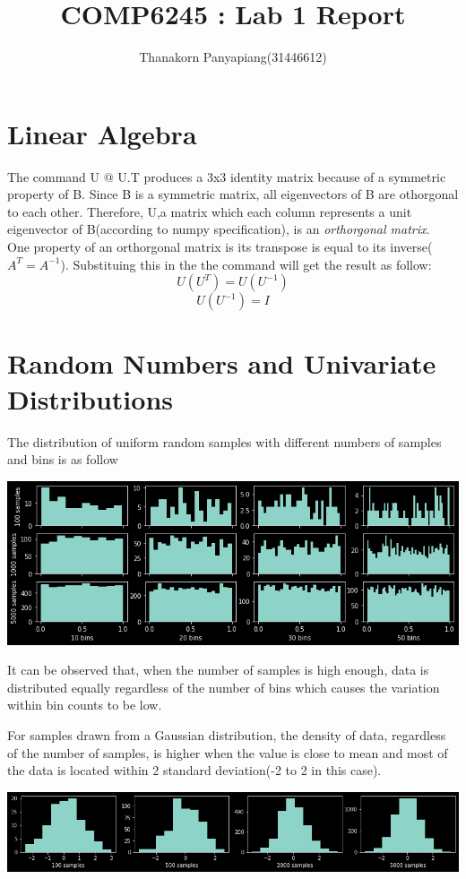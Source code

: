 \documentclass{article}
\title{COMP6245 : Lab 1 Report}
\author{Thanakorn Panyapiang(31446612)}
\begin{document}
\maketitle
\section{Linear Algebra}
\indent The command U @ U.T produces a 3x3 identity matrix because of a symmetric property of B. Since B is a symmetric matrix, all eigenvectors of B are othorgonal to each other. Therefore, U,a matrix which each column represents a unit eigenvector of B(according to numpy specification), is an \textit{orthorgonal matrix}.\\
\indent One property of an orthorgonal matrix is its transpose is equal to its inverse($A^T = A^{-1}$). Substituing this in the the command will get the result as follow:
\[U(U^T) = U(U^{-1})\]
\[U(U^{-1}) = I \] 

\maketitle
\section{Random Numbers and Univariate Distributions}
The distribution of uniform random samples with different numbers of samples and bins is as follow
\begin{center}
\includegraphics[scale=0.5]{uniform_random_numbers}
\end{center}
\indent It can be observed that, when the number of samples is high enough, data is distributed equally regardless of the number of bins which causes the variation within bin counts to be low.

\indent For samples drawn from a Gaussian distribution, the density of data, regardless of the number of samples, is higher when the value is close to mean and most of the data is located within 2 standard deviation(-2 to 2 in this case).
\begin{center}
\includegraphics[scale=0.4]{gaussian_random_numbers}
\end{center}
\end{document}
